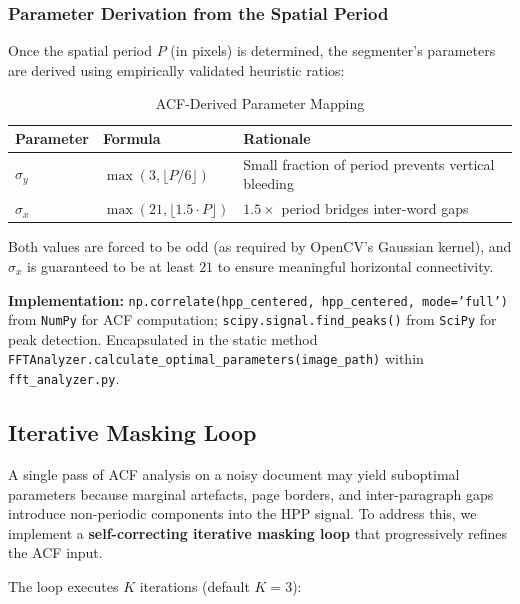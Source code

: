 \documentclass[12pt, a4paper]{article}
\begin{document}
\subsubsection{Parameter Derivation from the Spatial Period}

Once the spatial period $P$ (in pixels) is determined, the segmenter's parameters are derived using empirically validated heuristic ratios:

\begin{table}[H]
\centering
\caption{ACF-Derived Parameter Mapping}
\label{tab:acf_mapping}
\begin{tabular}{@{}lll@{}}
\toprule
\textbf{Parameter} & \textbf{Formula} & \textbf{Rationale} \\
\midrule
$\sigma_y$ & $\max(3, \lfloor P/6 \rfloor)$ & Small fraction of period prevents vertical bleeding \\
$\sigma_x$ & $\max(21, \lfloor 1.5 \cdot P \rfloor)$ & $1.5\times$ period bridges inter-word gaps \\
\bottomrule
\end{tabular}
\end{table}

Both values are forced to be odd (as required by OpenCV's Gaussian kernel), and $\sigma_x$ is guaranteed to be at least $21$ to ensure meaningful horizontal connectivity.

\textbf{Implementation:} \texttt{np.correlate(hpp\_centered, hpp\_centered, mode='full')} from \texttt{NumPy} for ACF computation; \texttt{scipy.signal.find\_peaks()} from \texttt{SciPy} for peak detection. Encapsulated in the static method \texttt{FFTAnalyzer.calculate\_optimal\_parameters(image\_path)} within \texttt{fft\_analyzer.py}.


\subsection{Iterative Masking Loop}
\label{sec:iterative_loop}

A single pass of ACF analysis on a noisy document may yield suboptimal parameters because marginal artefacts, page borders, and inter-paragraph gaps introduce non-periodic components into the HPP signal. To address this, we implement a \textbf{self-correcting iterative masking loop} that progressively refines the ACF input.

The loop executes $K$ iterations (default $K = 3$):
\end{document}

